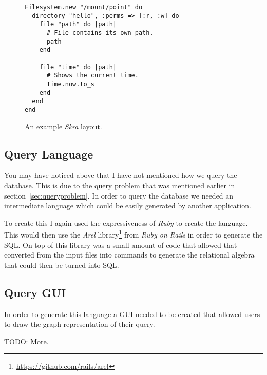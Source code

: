 \begin{figure}
\begin{verbatim}
Filesystem.new "/mount/point" do
  directory "hello", :perms => [:r, :w] do
    file "path" do |path|
      # File contains its own path.
      path
    end

    file "time" do |path|
      # Shows the current time.
      Time.now.to_s
    end
  end
end
\end{verbatim}
  \caption{An example \emph{Skra} layout.}
  \label{fig:skra}
\end{figure}

\subsection{Query Language}

You may have noticed above that I have not mentioned how we query the database.
This is due to the query problem that was mentioned earlier in
section~\ref{sec:queryproblem}. In order to query the database we needed an
intermediate language which could be easily generated by another application.

To create this I again used the expressiveness of \emph{Ruby} to create the
language. This would then use the \emph{Arel}
library\footnote{\url{https://github.com/rails/arel}} from \emph{Ruby on Rails}
in order to generate the \ac{SQL}. On top of this library was a small amount of
code that allowed that converted from the input files into commands to generate
the relational algebra that could then be turned into \ac{SQL}.


\subsection{Query GUI}

In order to generate this language a \ac{GUI} needed to be created that allowed
users to draw the graph representation of their query.

TODO: More.
